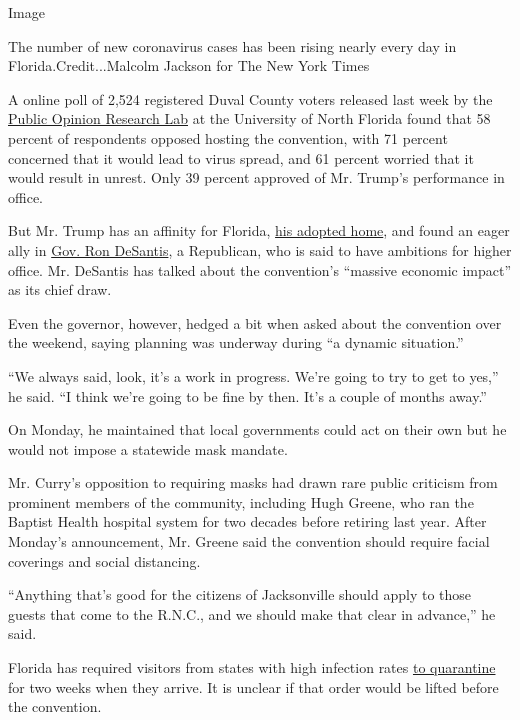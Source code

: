 Image

The number of new coronavirus cases has been rising nearly every day in
Florida.Credit...Malcolm Jackson for The New York Times

A online poll of 2,524 registered Duval County voters released last week
by the
\href{https://www.unf.edu/uploadedFiles/aa/coas/porl/JaxSpeaks0620.pdf}{Public
Opinion Research Lab} at the University of North Florida found that 58
percent of respondents opposed hosting the convention, with 71 percent
concerned that it would lead to virus spread, and 61 percent worried
that it would result in unrest. Only 39 percent approved of Mr. Trump's
performance in office.

But Mr. Trump has an affinity for Florida,
\href{https://www.nytimes.com/2019/10/31/us/politics/trump-new-york-florida-primary-residence.html}{his
adopted home}, and found an eager ally in
\href{https://www.nytimes.com/2020/04/01/us/coronavirus-florida-de-santis-trump.html}{Gov.
Ron DeSantis}, a Republican, who is said to have ambitions for higher
office. Mr. DeSantis has talked about the convention's ``massive
economic impact'' as its chief draw.

Even the governor, however, hedged a bit when asked about the convention
over the weekend, saying planning was underway during ``a dynamic
situation.''

``We always said, look, it's a work in progress. We're going to try to
get to yes,'' he said. ``I think we're going to be fine by then. It's a
couple of months away.''

On Monday, he maintained that local governments could act on their own
but he would not impose a statewide mask mandate.

Mr. Curry's opposition to requiring masks had drawn rare public
criticism from prominent members of the community, including Hugh
Greene, who ran the Baptist Health hospital system for two decades
before retiring last year. After Monday's announcement, Mr. Greene said
the convention should require facial coverings and social distancing.

``Anything that's good for the citizens of Jacksonville should apply to
those guests that come to the R.N.C., and we should make that clear in
advance,'' he said.

Florida has required visitors from states with high infection rates
\href{https://www.nytimes.com/2020/03/25/us/coronavirus-united-states.html}{to
quarantine} for two weeks when they arrive. It is unclear if that order
would be lifted before the convention.

